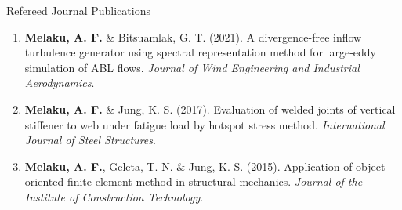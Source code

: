 \documentclass{resume} %
\begin{document}




\begin{rSection}{Refereed Journal Publications}

\begin{enumerate}

\item {\bf Melaku, A. F.} \& Bitsuamlak, G. T. (2021). A divergence-free inflow turbulence generator using spectral representation method for large-eddy simulation of ABL flows. \emph{Journal of Wind Engineering and Industrial Aerodynamics}.

\item {\bf Melaku, A. F.} \& Jung, K. S. (2017). Evaluation of welded joints of vertical stiffener to web under fatigue load by hotspot stress method. \emph{International Journal of Steel Structures}.

\item {\bf Melaku, A. F.}, Geleta, T. N. \& Jung, K. S. (2015). Application of object-oriented finite element method in structural mechanics. \emph{Journal of the Institute of Construction Technology}.

\end{enumerate}
\end{rSection}

\newpage


\end{document}
